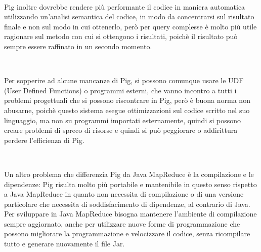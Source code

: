 \documentclass[11pt]{article} %
\begin{document}
~

Pig inoltre dovrebbe rendere più performante il codice in maniera automatica utilizzando un'analisi semantica del codice, in modo da concentrarsi sul risultato finale e non sul modo in cui ottenerlo, però per query complesse è molto più utile ragionare sul metodo con cui si ottengono i risultati, poichè il risultato può sempre essere raffinato in un secondo momento.

~
 
Per sopperire ad alcune mancanze di Pig, si possono comunque usare le UDF (User Defined Functions) o programmi esterni, che vanno incontro a tutti i problemi progettuali che si possono riscontrare in Pig, però è buona norma non abusarne, poichè questo sistema esegue ottimizzazioni sul codice scritto nel suo linguaggio, ma non su programmi importati esternamente, quindi si possono creare problemi di spreco di risorse e quindi si può peggiorare o addirittura perdere l'efficienza di Pig.

~

Un altro problema che differenzia Pig da Java MapReduce è la compilazione e le dipendenze: Pig risulta molto più portabile e mantenibile in questo senso rispetto a Java MapReduce in quanto non necessita di compilazione o di una versione particolare che necessita di soddisfacimento di dipendenze, al contrario di Java. Per sviluppare in Java MapReduce bisogna mantenere l'ambiente di compilazione sempre aggiornato, anche per utilizzare nuove forme di programmazione che possono migliorare la programmazione e velocizzare il codice, senza ricompilare tutto e generare nuovamente il file Jar.
\end{document}
